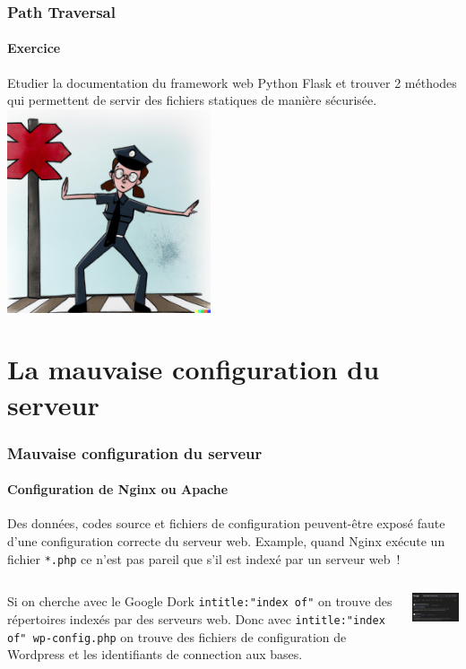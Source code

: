\documentclass{beamer}
\begin{document}
    \begin{frame}
        \frametitle{Path Traversal}
        \framesubtitle{Exercice \execcounterdispinc{}}
        \transdissolve
        Etudier la documentation du framework web Python Flask et trouver 2 méthodes qui permettent de servir des fichiers statiques de manière sécurisée.
        \bigbreak
        \centering
        \includegraphics[width=6cm]{image/police-blocking-the-road}
    \end{frame}


    \section{La mauvaise configuration du serveur}\label{sec:configuration-serveur}

    \begin{frame}
        \frametitle{Mauvaise configuration du serveur}
        \framesubtitle{Configuration de Nginx ou Apache}
        \transdissolve
        Des données, codes source et fichiers de configuration peuvent-être exposé faute d'une configuration correcte du serveur web.
        \bigbreak
        Example, quand Nginx exécute un fichier \lstinline{*.php} ce n'est pas pareil que s'il est indexé par un serveur web~!
        \bigbreak
        \begin{columns}
            \begin{column}{0.6\textwidth}
                Si on cherche avec le Google Dork \lstinline{intitle:"index of"} on trouve des répertoires indexés par des serveurs web.
                Donc avec \lstinline{intitle:"index of" wp-config.php} on trouve des fichiers de configuration de Wordpress et les identifiants de connection aux bases.

            \end{column}
            \begin{column}{0.4\textwidth}
                \centering
                \includegraphics[width=5cm]{image/dork-on-google}
            \end{column}
        \end{columns}
    \end{frame}
\end{document}

